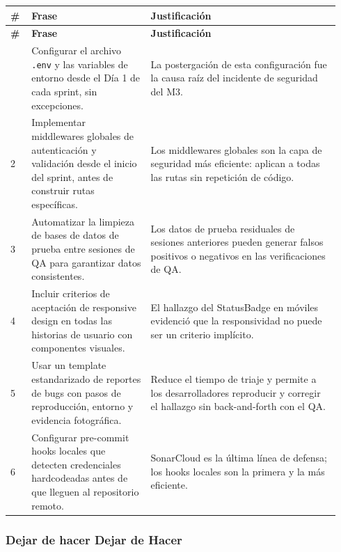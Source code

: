 \documentclass[11pt,a4paper]{article}
\begin{document}
\begingroup
\scriptsize
\setlength{\tabcolsep}{3pt}
\begin{longtable}{P{0.06\linewidth}P{0.34\linewidth}P{0.54\linewidth}}
\toprule
\textbf{\#} & \textbf{Frase} & \textbf{Justificación} \\
\midrule
\endfirsthead
\toprule
\textbf{\#} & \textbf{Frase} & \textbf{Justificación} \\
\midrule
\endhead
\bottomrule
{} & Configurar el archivo \texttt{.env} y las variables de entorno desde el Día 1 de cada sprint, sin excepciones. & La postergación de esta configuración fue la causa raíz del incidente de seguridad del M3. \\
2 & Implementar middlewares globales de autenticación y validación desde el inicio del sprint, antes de construir rutas específicas. & Los middlewares globales son la capa de seguridad más eficiente: aplican a todas las rutas sin repetición de código. \\
3 & Automatizar la limpieza de bases de datos de prueba entre sesiones de QA para garantizar datos consistentes. & Los datos de prueba residuales de sesiones anteriores pueden generar falsos positivos o negativos en las verificaciones de QA. \\
4 & Incluir criterios de aceptación de responsive design en todas las historias de usuario con componentes visuales. & El hallazgo del StatusBadge en móviles evidenció que la responsividad no puede ser un criterio implícito. \\
5 & Usar un template estandarizado de reportes de bugs con pasos de reproducción, entorno y evidencia fotográfica. & Reduce el tiempo de triaje y permite a los desarrolladores reproducir y corregir el hallazgo sin back-and-forth con el QA. \\
6 & Configurar pre-commit hooks locales que detecten credenciales hardcodeadas antes de que lleguen al repositorio remoto. & SonarCloud es la última línea de defensa; los hooks locales son la primera y la más eficiente. \\
\end{longtable}
\endgroup

\subsubsection{Dejar de hacer Dejar de Hacer}
\end{document}
